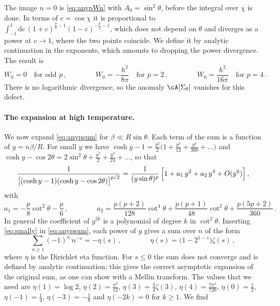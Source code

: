 \documentclass[a4paper,11pt]{article}
\newcommand{\dd}{\mathrm{d}}
\begin{document}
	The image $n=0$ is \eqref{eq:anypWn} with $A_0=\sin^2\theta$, before the integral over $\chi$ is done. In terms of $c=\cos\chi$ it is proportional to $\int_{-1}^1\dd c\,(1+c)^{\frac p2-1}(1-c)^{-\frac p2-1}$, which does not depend on $\theta$ and diverges as a power at $c\to1$, where the two points coincide. We define it by analytic continuation in the exponents, which amounts to dropping the power divergence. The result is
	\begin{equation}\label{eq:W0}
		W_0=0\quad\text{for odd }p\, ,\qquad\qquad W_0=-\frac{h^2}{8\pi}\quad\text{for }p=2\, ,\qquad\qquad W_0=\frac{h^2}{16\pi}\quad\text{for }p=4\, .
	\end{equation}
	There is no logarithmic divergence, so the anomaly $\cA[\Sigma_\theta]$ vanishes for this defect.
	
	\paragraph{The expansion at high temperature.}
	We now expand \eqref{eq:anypsum} for $\beta\ll R\sin\theta$. Each term of the sum is a function of $y=n\beta/R$. For small $y$ we have $\cosh y-1=\tfrac{y^2}{2}\bigl(1+\tfrac{y^2}{12}+\tfrac{y^4}{360}+\dots\bigr)$ and $\cosh y-\cos2\theta=2\sin^2\theta+\tfrac{y^2}{2}+\tfrac{y^4}{24}+\dots$, so that
	\begin{equation}\label{eq:smally}
		\frac{1}{\bigl[(\cosh y-1)(\cosh y-\cos2\theta)\bigr]^{p/2}}=\frac{1}{(y\sin\theta)^p}\,\Bigl[1+a_1\,y^2+a_2\,y^4+O(y^6)\Bigr]\, ,
	\end{equation}
	with
	\begin{equation}\label{eq:a1a2}
		a_1=-\frac p8\cot^2\theta-\frac p6\, ,\qquad\qquad
		a_2=\frac{p(p+2)}{128}\cot^4\theta+\frac{p(p+1)}{48}\cot^2\theta+\frac{p(5p+2)}{360}\, .
	\end{equation}
	In general the coefficient of $y^{2k}$ is a polynomial of degree $k$ in $\cot^2\theta$. Inserting \eqref{eq:smally} in \eqref{eq:anypsum}, each power of $y$ gives a sum over $n$ of the form
	\begin{equation}\label{eq:eta}
		\sum_{n\ge1}(-1)^n\,n^{-s}=-\eta(s)\, ,\qquad\qquad \eta(s)=\bigl(1-2^{1-s}\bigr)\zeta(s)\, ,
	\end{equation}
	where $\eta$ is the Dirichlet eta function. For $s\le0$ the sum does not converge and is defined by analytic continuation; this gives the correct asymptotic expansion of the original sum, as one can show with a Mellin transform. The values that we need are $\eta(1)=\log2$, $\eta(2)=\tfrac{\pi^2}{12}$, $\eta(3)=\tfrac34\zeta(3)$, $\eta(4)=\tfrac{7\pi^4}{720}$, $\eta(0)=\tfrac12$, $\eta(-1)=\tfrac14$, $\eta(-3)=-\tfrac18$ and $\eta(-2k)=0$ for $k\ge1$. We find
\end{document}
